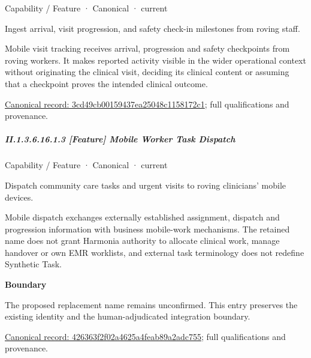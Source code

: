 \label{element:3cd49cb00159437ea25048c1158172c1}
{\small Capability / Feature · Canonical · current}\par

Ingest arrival, visit progression, and safety check-in milestones from roving staff.



Mobile visit tracking receives arrival, progression and safety checkpoints from roving workers. It makes reported activity visible in the wider operational context without originating the clinical visit, deciding its clinical content or assuming that a checkpoint proves the intended clinical outcome.


{\footnotesize \href{../../../../continuum/strategy/capability/feature/3cd49cb00159437ea25048c1158172c1.md}{Canonical record: 3cd49cb00159437ea25048c1158172c1}; full qualifications and provenance.}\par
\subparagraph*{II.1.3.6.16.1.3 [Feature] Mobile Worker Task Dispatch}
\label{navigation:II.1.3.6.16.1.3}

\label{element:426363f2f02a4625a4feab89a2adc755}
{\small Capability / Feature · Canonical · current}\par

Dispatch community care tasks and urgent visits to roving clinicians' mobile devices.



Mobile dispatch exchanges externally established assignment, dispatch and progression information with business mobile-work mechanisms. The retained name does not grant Harmonia authority to allocate clinical work, manage handover or own EMR worklists, and external task terminology does not redefine Synthetic Task.



\textbf{Boundary}



The proposed replacement name remains unconfirmed. This entry preserves the existing identity and the human-adjudicated integration boundary.


{\footnotesize \href{../../../../continuum/strategy/capability/feature/426363f2f02a4625a4feab89a2adc755.md}{Canonical record: 426363f2f02a4625a4feab89a2adc755}; full qualifications and provenance.}\par
